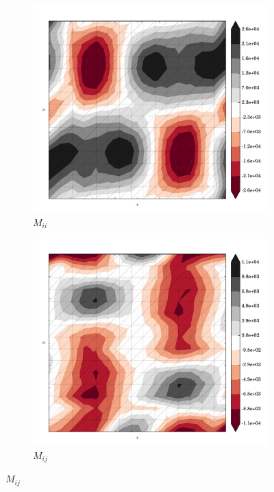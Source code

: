 \begin{figure}
  \begin{subfigure}[b]{0.3\linewidth}
    \includegraphics[width=\linewidth]{images/stress_balance/BP/M_ii.pdf}
  \caption{$M_{ii}$}
  \label{bp_M_ii}
  \end{subfigure}
  \begin{subfigure}[b]{0.3\linewidth}
    \includegraphics[width=\linewidth]{images/stress_balance/BP/M_ij.pdf}
  \caption{$M_{ij}$}
  \label{bp_M_ij}
  \end{subfigure}

\end{figure}
